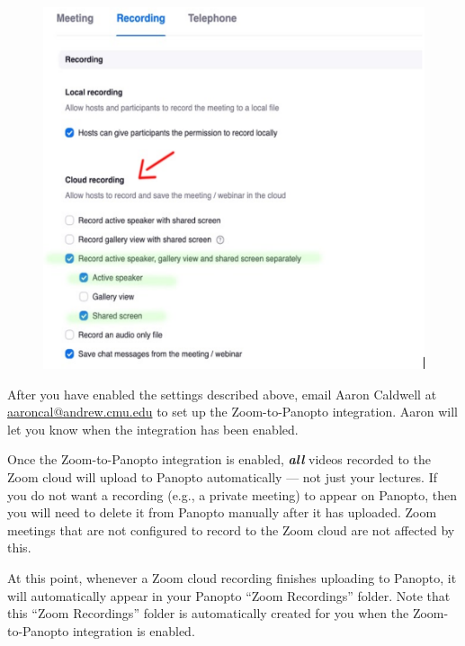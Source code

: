 \begin{gram}[Step 1/2]
	\begin{figure}[H]
		\centering
		\includegraphics[scale=0.5]{panopto/media/04-settings.png}
	\end{figure}
\end{gram}

\begin{gram}[Step 2/2]
	After you have enabled the settings described above, email Aaron Caldwell at \href{mailto:aaroncal@andrew.cmu.edu?subject=Zoom-to-Panopto}{aaroncal@andrew.cmu.edu} to set up the Zoom-to-Panopto integration. Aaron will let you know when the integration has been enabled.
\end{gram}

\begin{important}
	Once the Zoom-to-Panopto integration is enabled, \emph{\textbf{all}} videos recorded to the Zoom cloud will upload to Panopto automatically --- not just your lectures. If you do not want a recording (e.g., a private meeting) to appear on Panopto, then you will need to delete it from Panopto manually after it has uploaded. Zoom meetings that are not configured to record to the Zoom cloud are not affected by this.
\end{important}

\begin{gram}
 	At this point, whenever a Zoom cloud recording finishes uploading to Panopto, it will automatically appear in your Panopto ``Zoom Recordings'' folder. Note that this ``Zoom Recordings'' folder is automatically created for you when the Zoom-to-Panopto integration is enabled.
\end{gram}

